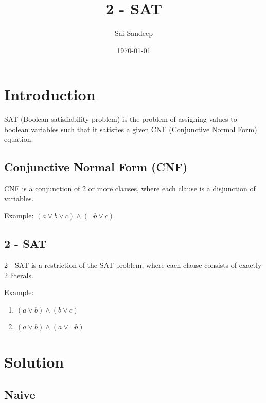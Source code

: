 \documentclass[titlepage, 12pt]{article}
\begin{document}
	
	\title{2 - SAT}
	
	\author{Sai Sandeep}
	
	\date{\today}
	
	\maketitle
	
	\tableofcontents
	
	\newpage
	
	\section{Introduction}
	SAT (Boolean satisfiability problem) is the problem of assigning values to boolean variables such that it satisfies a given CNF (Conjunctive Normal Form) equation.
	
	\subsection{Conjunctive Normal Form (CNF)}
	
	CNF is a conjunction of 2 or more clauses, where each clause is a disjunction of variables.
	
	Example: $ (a \lor b \lor c) \land (\lnot b \lor c) $
	
	\subsection{2 - SAT}
	
	2 - SAT is a restriction of the SAT problem, where each clause consists of exactly 2 literals.

	Example: 
	
	\begin{enumerate}
	
	\item $ (a \lor b) \land (b \lor c) $
	
	\item $ (a \lor b) \land (a \lor \lnot b) $
	
	\end{enumerate}
	
	\section{Solution}
	
	\subsection{Naive}
	
\end{document}
